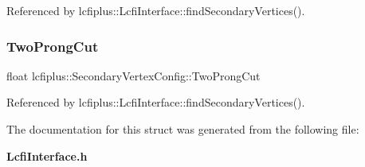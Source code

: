 Referenced by lcfiplus\+::\+Lcfi\+Interface\+::find\+Secondary\+Vertices().

\mbox{\label{structlcfiplus_1_1SecondaryVertexConfig_a93de9ac2d096836d0ee7a55070c2f68d}} 
\subsubsection{Two\+Prong\+Cut}
{\footnotesize\ttfamily float lcfiplus\+::\+Secondary\+Vertex\+Config\+::\+Two\+Prong\+Cut}



Referenced by lcfiplus\+::\+Lcfi\+Interface\+::find\+Secondary\+Vertices().



The documentation for this struct was generated from the following file\+:\begin{DoxyCompactItemize}
\item 
\textbf{ Lcfi\+Interface.\+h}\end{DoxyCompactItemize}
